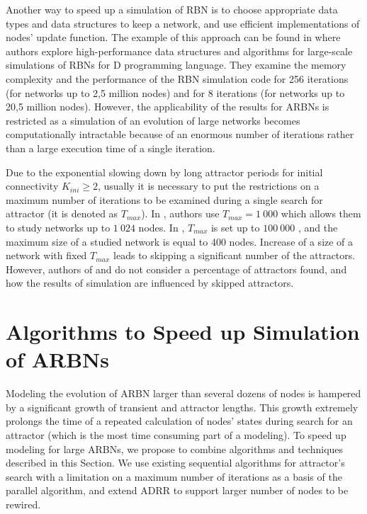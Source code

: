 \documentclass[procedia]{easychair}
\begin{document}
	Another way to speed up a simulation of RBN is to choose appropriate data types and data structures to keep a network, and use efficient implementations of nodes' update function. The example of this approach can be found in \cite{hawick2007simulating} where authors explore high-performance data structures and algorithms for large-scale simulations of RBNs for D programming language. They examine the memory complexity and the performance of the RBN simulation code for 256 iterations (for networks up to 2,5 million nodes) and for 8 iterations (for networks up to 20,5 million nodes). However, the applicability of the results for ARBNs is restricted as a simulation of an evolution of large networks becomes computationally intractable because of an enormous number of iterations rather than a large execution time of a single iteration.
	
	Due to the exponential slowing down by long attractor periods for initial connectivity $K_{ini} \geq 2$, usually it is necessary to put the restrictions on a maximum number of iterations to be examined during a single search for attractor (it is denoted as $T_{max}$). In \cite{bornholdt2000topological}, authors use $T_{max} = 1~000$ which allows them to study networks up to $1~024$ nodes. In \cite{mlb}, $T_{max}$ is set up to $100~000$ , and the maximum size of a studied network is equal to 400 nodes. Increase of a size of a network with fixed $T_{max}$ leads to skipping a significant number of the attractors. However, authors of \cite{bornholdt2000topological} and \cite{mlb} do not consider a percentage of attractors found, and how the results of simulation are influenced by skipped attractors.
	

	\section{Algorithms to Speed up Simulation of ARBNs}
	\label{sect:algorithm}
	
	
	Modeling the evolution of ARBN larger than several dozens of nodes is hampered by a significant growth of transient and attractor lengths. This growth extremely prolongs the time of a repeated calculation of nodes' states during search for an attractor (which is the most time consuming part of a modeling). To speed up modeling for large ARBNs, we propose to combine algorithms and techniques described in this Section. We use existing sequential algorithms for attractor's search with a limitation on a maximum number of iterations as a basis of the parallel algorithm, and extend ADRR to support larger number of nodes to be rewired. 
	
\end{document}
